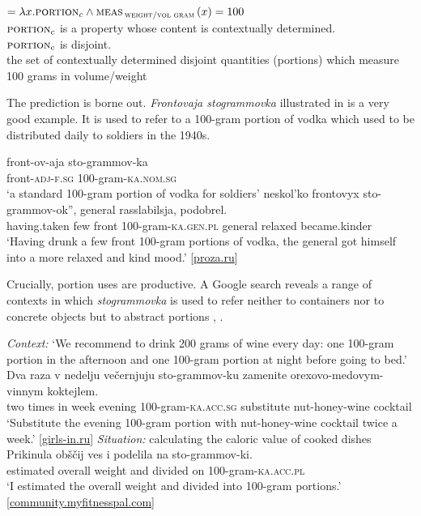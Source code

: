 \documentclass[output=paper]{langscibook}
\begin{document}
\ea\label{ex:khrizmann:37}  $= \lambda x.\textsc{portion}_{c} \wedge \textsc{meas}\,_{\textsc{weight/vol gram}}\,(x) = 100$\\
\hspace{.9em} {$\textsc{portion}_{c}$ is a property whose content is contextually determined.\\
\hspace{1em} $\textsc{portion}\textsubscript{c}$ is disjoint.\\
the set of contextually determined disjoint quantities (portions) which measure 100 grams in volume/weight}
\z

\noindent The prediction is borne out. \textit{Frontovaja stogrammovka} illustrated in  is a very good example. It is used to refer to a 100-gram portion of vodka which used to be distributed daily to soldiers in the 1940s.

\ea\label{ex:khrizmann:38}
    \ea \gll front-ov-aja sto-grammov-ka\\
    front-\textsc{adj-f.sg} 100-gram-\textsc{ka.nom.sg}\\
    \glt `a standard 100-gram portion of vodka for soldiers'
    \ex {} neskol'ko  frontovyx sto-grammov-ok'', general rasslabilsja, podobrel.\\
    having.taken few {} front 100-gram-\textsc{ka.gen.pl} general relaxed became.kinder\\
    \glt `Having drunk a few front 100-gram portions of vodka, the general got himself into a more relaxed and kind mood.' \hfill [\href{https://www.proza.ru/2012/07/06/1250}{proza.ru}]
\z\z

\noindent Crucially, portion uses are productive. A Google search reveals a range of contexts in which \textit{stogrammovka} is used to refer neither to containers nor to concrete objects but to abstract portions , .

\ea\label{ex:khrizmann:39} \textit{Context:} `We recommend to drink 200 grams of wine every day: one 100-gram portion in the afternoon and one 100-gram portion at night before going to bed.'\\
\gll Dva raza v nedelju večernjuju sto-grammov-ku zamenite orexovo-medovym-vinnym koktejlem.\\
two times in week evening 100-gram-\textsc{ka.acc.sg} substitute nut-honey-wine cocktail\\
\glt `Substitute the evening 100-gram portion with nut-honey-wine cocktail twice a week.' \hfill [\href{http://girls-in.ru/pub/1320}{girls-in.ru}]
\ex\label{ex:khrizmann:40} \textit{Situation:} calculating the caloric value of cooked dishes\\
\gll Prikinula obščij ves i podelila na sto-grammov-ki.\\
estimated overall weight and divided on 100-gram-\textsc{ka.acc.pl}\\
\glt `I estimated the overall weight and divided into 100-gram portions.'\\
\glt \hfill [\href{https://community.myfitnesspal.com/ru/discussion/1469795/pomogite-s-podschetami-kaloriynosti-gotovogo-blyuda}{community.myfitnesspal.com}]
\z
\end{document}
